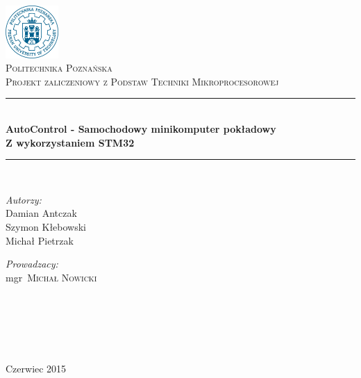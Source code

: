 \documentclass[a4paper,10pt,oneside]{book}
\begin{document}
\begin{sloppypar}

\begin{titlepage}
\begin{center}
\includegraphics[width=0.15\textwidth]{./img/logo.jpg}~\\[1.3cm]
\textsc{\LARGE Politechnika Poznańska}\\[4cm]
\textsc{\Large Projekt zaliczeniowy z Podstaw Techniki Mikroprocesorowej}\\[0.1cm]
\rule{10cm}{0.4pt}\\[0.4cm]
{ 
	\huge \bfseries AutoControl - Samochodowy minikomputer pokładowy \\[0.35cm] 
	\small Z wykorzystaniem STM32 \\[0.4cm] 
}
\rule{10cm}{0.4pt} \\[3.5cm]
\noindent
\begin{minipage}{0.4\textwidth}
\begin{flushleft} 
\large
\emph{Autorzy:}
\\ Damian Antczak
\\ Szymon Kłebowski 
\\ Michał Pietrzak 
\end{flushleft}
\end{minipage}%
\begin{minipage}{0.4\textwidth}
\begin{flushright} \large
\emph{Prowadzacy:} 
\\mgr~\textsc{Michał Nowicki} ~\\ ~\\ ~\\ ~\\ ~\\ ~\\ 
\end{flushright}
\end{minipage}
\vfill
{\large Czerwiec 2015}
\end{center}
\end{titlepage}

\clearpage
{}
\tableofcontents


\end{sloppypar}
\end{document}
